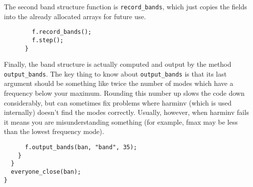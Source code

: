 The second band structure function is \verb-record_bands-, which just
copies the fields into the already allocated arrays for future use.

\begin{verbatim}
        f.record_bands();
        f.step();
      }
\end{verbatim}

Finally, the band structure is actually computed and output by the method
\verb-output_bands-.  The key thing to know about
\verb-output_bands- is that its last argument should be something like
twice the number of modes which have a frequency below your maximum.
Rounding this number up slows the code down considerably, but can sometimes
fix problems where harminv (which is used internally) doesn't find the
modes correctly.  Usually, however, when harminv fails it means you are
misunderstanding something (for example, fmax may be less than the lowest
frequency mode).

\begin{verbatim}
      f.output_bands(ban, "band", 35);
    }
  }
  everyone_close(ban);
}
\end{verbatim}
